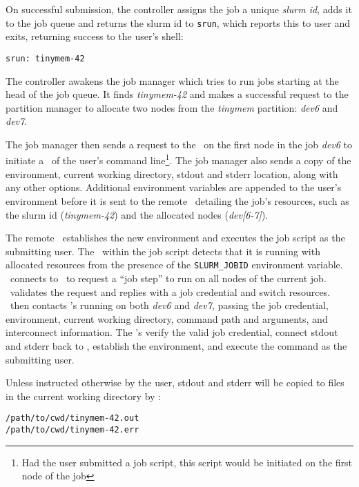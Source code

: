On successful submission, the controller assigns the job a unique 
{\em slurm id}, adds it to the job queue and returns the 
slurm id to {\tt srun}, which reports this to user and exits, returning
success to the user's shell:

\begin{verbatim}
srun: tinymem-42
\end{verbatim}

The controller awakens the job manager which tries to run
jobs starting at the head of the job queue.  It finds {\em tinymem-42}
and makes a successful request to the partition manager to allocate 
two nodes from the {\em tinymem} partition: {\em dev6} and {\em dev7}.

The job manager then sends a request to the \slurmd\ on the first node 
in the job {\em dev6} to initiate a \srun\ of the user's
command line\footnote{Had the user submitted a job script, this script would
be initiated on the first node of the job}. The job manager also sends a 
copy of the environment, current working directory, stdout and stderr location,
along with any other options. Additional environment variables are appended
to the user's environment before it is sent to the remote \slurmd\ detailing
the job's resources, such as the slurm id ({\em tinymem-42}) and the
allocated nodes ({\em dev[6-7]}).

The remote \slurmd\ establishes the new environment and executes the
job script as the submitting user. The \srun\ within the job script
detects that it is running with allocated resources from the presence
of the {\tt SLURM\_JOBID} environment variable. \srun\ connects to
\slurmctld\ to request a ``job step'' to run on all nodes of the current
job. \slurmctld\ validates the request and replies with a job credential
and switch resources. \srun\ then contacts \slurmd 's running on both
{\em dev6} and {\em dev7}, passing the job credential, environment,
current working directory, command path and arguments, and interconnect
information. The \slurmd 's verify the valid job credential, connect
stdout and stderr back to \srun , establish the environment, and execute
the command as the submitting user.

Unless instructed otherwise by the user, stdout and stderr will be
copied to files in the current working directory by \srun :

\begin{verbatim}
/path/to/cwd/tinymem-42.out
/path/to/cwd/tinymem-42.err
\end{verbatim}

